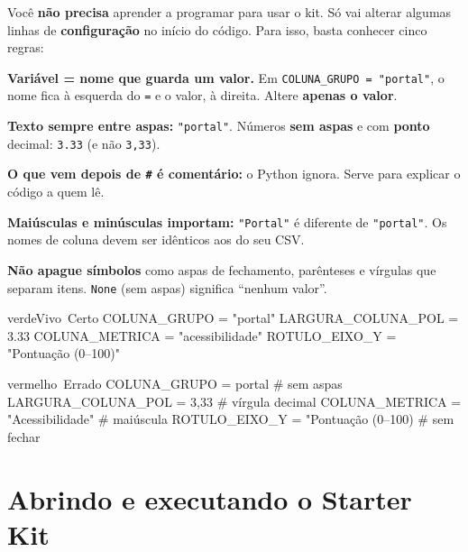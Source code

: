 \documentclass[11pt,a4paper]{article}
\newcommand{\circulo}[2][azul]{\tikz[baseline=(c.base)]\node[circle, fill=#1, text=white,
    inner sep=0pt, minimum size=1.35em, font=\footnotesize\bfseries](c){#2};}
\begin{document}
Você \textbf{não precisa} aprender a programar para usar o kit. Só vai alterar algumas linhas de \textbf{configuração} no início do código. Para isso, basta conhecer cinco regras:

\begin{enumerate}[label={\protect\circulo[verdeVivo]{\arabic*}}]
    \item \textbf{Variável = nome que guarda um valor.} Em \texttt{COLUNA\_GRUPO = "portal"}, o nome fica à esquerda do \texttt{=} e o valor, à direita. Altere \textbf{apenas o valor}.
    \item \textbf{Texto sempre entre aspas:} \texttt{"portal"}. Números \textbf{sem aspas} e com \textbf{ponto} decimal: \texttt{3.33} (e não \texttt{3,33}).
    \item \textbf{O que vem depois de \texttt{\#} é comentário:} o Python ignora. Serve para explicar o código a quem lê.
    \item \textbf{Maiúsculas e minúsculas importam:} \texttt{"Portal"} é diferente de \texttt{"portal"}. Os nomes de coluna devem ser idênticos aos do seu CSV.
    \item \textbf{Não apague símbolos} como aspas de fechamento, parênteses e vírgulas que separam itens. \texttt{None} (sem aspas) significa ``nenhum valor''.
\end{enumerate}

\begin{tcbraster}[raster columns=2, raster equal height, raster column skip=8pt]
\begin{exemplo}{verdeVivo}{\faCheckCircle\ Certo}
COLUNA_GRUPO = "portal"
LARGURA_COLUNA_POL = 3.33
COLUNA_METRICA = "acessibilidade"
ROTULO_EIXO_Y = "Pontuação (0–100)"
\end{exemplo}
\begin{exemplo}{vermelho}{\faTimesCircle\ Errado}
COLUNA_GRUPO = portal       # sem aspas
LARGURA_COLUNA_POL = 3,33   # vírgula decimal
COLUNA_METRICA = "Acessibilidade"  # maiúscula
ROTULO_EIXO_Y = "Pontuação (0–100)  # sem fechar
\end{exemplo}
\end{tcbraster}

\section{Abrindo e executando o Starter Kit}\label{sec:kit}
\end{document}
